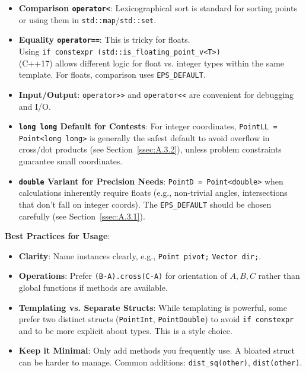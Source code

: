 \begin{implementation}
\begin{itemize}
    \item \textbf{Comparison \texttt{operator<}}: Lexicographical sort is standard for sorting points or using them in \texttt{std::map}/\texttt{std::set}.
    \item \textbf{Equality \texttt{operator==}}: This is tricky for floats.\\ Using \texttt{if constexpr (std::is\_floating\_point\_v<T>)} \\ (C++17) allows different logic for float vs. integer types within the same template. For floats, comparison uses \texttt{EPS\_DEFAULT}.
    \item \textbf{Input/Output}: \texttt{operator>>} and \texttt{operator<<} are convenient for debugging and I/O.
    \item \textbf{\texttt{long long} Default for Contests}: For integer coordinates, \texttt{PointLL = Point<long long>} is generally the safest default to avoid overflow in cross/dot products (see Section~\ref{ssec:A.3.2}), unless problem constraints guarantee small coordinates.
    \item \textbf{\texttt{double} Variant for Precision Needs}: \texttt{PointD = Point<double>} when calculations inherently require floats (e.g., non-trivial angles, intersections that don't fall on integer coords). The \texttt{EPS\_DEFAULT} should be chosen carefully (see Section~\ref{ssec:A.3.1}).
\end{itemize}
\end{implementation}

\begin{tipsbox}
\label{tips:A.5.1.point_struct_usage}
\textbf{Best Practices for Usage}:
\begin{itemize}
    \item \textbf{Clarity}: Name instances clearly, e.g., \texttt{Point pivot;} \texttt{Vector dir;}.
    \item \textbf{Operations}: Prefer \texttt{(B-A).cross(C-A)} for orientation of $A,B,C$ rather than global functions if methods are available.
    \item \textbf{Templating vs. Separate Structs}: While templating is powerful, some prefer two distinct structs (\texttt{PointInt}, \texttt{PointDouble}) to avoid \texttt{if constexpr} and to be more explicit about types. This is a style choice.
    \item \textbf{Keep it Minimal}: Only add methods you frequently use. A bloated struct can be harder to manage. Common additions: \texttt{dist\_sq(other)}, \texttt{dist(other)}.
\end{itemize}
\end{tipsbox}